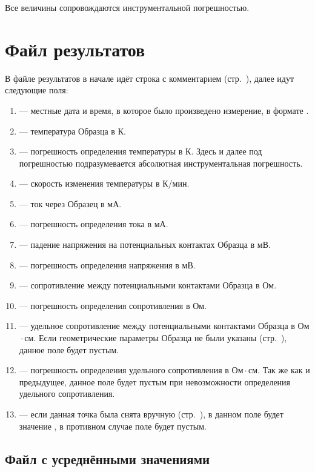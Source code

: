 \documentclass[12pt, a4paper, twocolumn]{report}
\begin{document}
Все величины сопровождаются инструментальной погрешностью.

\section{Файл результатов}

В файле результатов в начале идёт строка с комментарием (стр.~\pageref{sec_dut_comment}), далее идут следующие поля:

\begin{enumerate}
\item {} --- местные дата и время, в которое было произведено измерение, в формате \mbox{}.
\item {} --- температура Образца в К.
\item \CMD{+/-} --- погрешность определения температуры в К. Здесь и далее под погрешностью подразумевается абсолютная инструментальная погрешность.
\item {} --- скорость изменения температуры в К/мин.
\item {} --- ток через Образец в мА.
\item \CMD{+/-} --- погрешность определения тока в мА.
\item {} --- падение напряжения на потенциальных контактах Образца в мВ.
\item \CMD{+/-} --- погрешность определения напряжения в мВ.
\item {} --- сопротивление между потенциальными контактами Образца в Ом.
\item \CMD{+/-} --- погрешность определения сопротивления в Ом.
\item {} --- удельное сопротивление между потенциальными контактами Образца в Ом${}\cdot{}$см. Если геометрические параметры Образца не были указаны (стр.~\pageref{sec_geom_params}), данное поле будет пустым.
\item \CMD{+/-} --- погрешность определения удельного сопротивления в Ом${}\cdot{}$см. Так же как и предыдущее, данное поле будет пустым при невозможности определения удельного сопротивления.
\item {} --- если данная точка была снята вручную (стр.~\pageref{sec_manual}), в данном поле будет значение , в противном случае поле будет пустым.
\end{enumerate}

\subsection{Файл с усреднёнными значениями}
\end{document}
